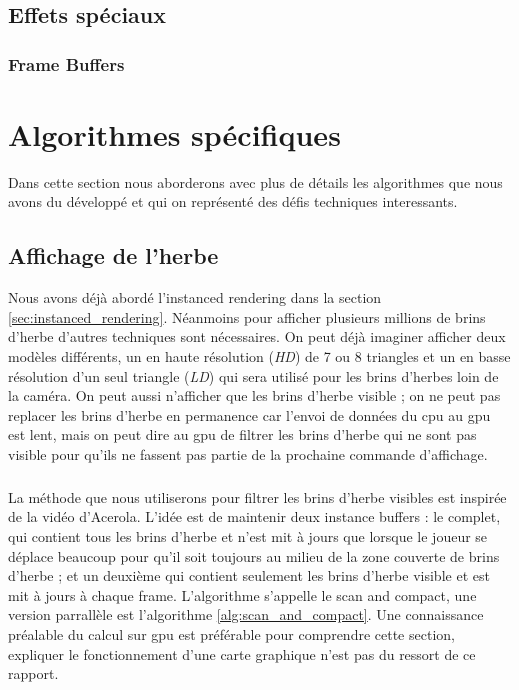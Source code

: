 \documentclass{EPUProjetDi}
\begin{document}
\section{Effets spéciaux}


\subsection{Frame Buffers} %
\label{sec:framebuffers}


\chapter{Algorithmes spécifiques}

Dans cette section nous aborderons avec plus de détails les algorithmes que nous avons du développé et qui on représenté des défis techniques interessants.

\section{Affichage de l'herbe}
\label{section:grass_rendering}

Nous avons déjà abordé l'instanced rendering dans la section \ref{sec:instanced_rendering}. Néanmoins pour afficher plusieurs millions de brins d'herbe d'autres techniques sont nécessaires. On peut déjà imaginer afficher deux modèles différents, un en haute résolution (\textit{HD}) de 7 ou 8 triangles et un en basse résolution d'un seul triangle (\textit{LD}) qui sera utilisé pour les brins d'herbes loin de la caméra. On peut aussi n'afficher que les brins d'herbe visible ; on ne peut pas replacer les brins d'herbe en permanence car l'envoi de données du cpu au gpu est lent, mais on peut dire au gpu de filtrer les brins d'herbe qui ne sont pas visible pour qu'ils ne fassent pas partie de la prochaine commande d'affichage.

\paragraph{}
La méthode que nous utiliserons pour filtrer les brins d'herbe visibles est inspirée de la vidéo d'Acerola\cite{grass_rendering}. L'idée est de maintenir deux instance buffers : le complet, qui contient tous les brins d'herbe et n'est mit à jours que lorsque le joueur se déplace beaucoup pour qu'il soit toujours au milieu de la zone couverte de brins d'herbe ; et un deuxième qui contient seulement les brins d'herbe visible et est mit à jours à chaque frame. L'algorithme s'appelle le scan and compact, une version parrallèle est l'algorithme \ref{alg:scan_and_compact}. Une connaissance préalable du calcul sur gpu est préférable pour comprendre cette section, expliquer le fonctionnement d'une carte graphique n'est pas du ressort de ce rapport.
\end{document}
